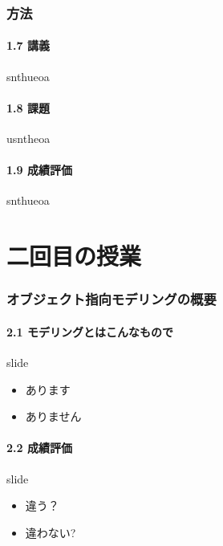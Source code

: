 \documentclass[t]{beamer}
\begin{document}
\section{方法}
\label{sec-1-3}
\subsection{1.7 講義}
\label{sec-1-3-1}
\begin{frame}[label=sec-1-3-1-1]{snthueoa}
\end{frame}
\subsection{1.8 課題}
\label{sec-1-3-2}
\begin{frame}[label=sec-1-3-2-1]{usntheoa}
\end{frame}
\subsection{1.9 成績評価}
\label{sec-1-3-3}
\begin{frame}[label=sec-1-3-3-1]{snthueoa}
\end{frame}
\part{二回目の授業}
\label{sec-2}
\section{オブジェクト指向モデリングの概要}
\label{sec-2-1}
\subsection{2.1 モデリングとはこんなもので}
\label{sec-2-1-1}
\begin{frame}[label=sec-2-1-1-1]{slide}
\begin{itemize}
\item あります
\item ありません
\end{itemize}
\end{frame}
\subsection{2.2 成績評価}
\label{sec-2-1-2}
\begin{frame}[label=sec-2-1-2-1]{slide}
\begin{itemize}
\item 違う？
\item 違わない?
\end{itemize}
\end{frame}
\end{document}
